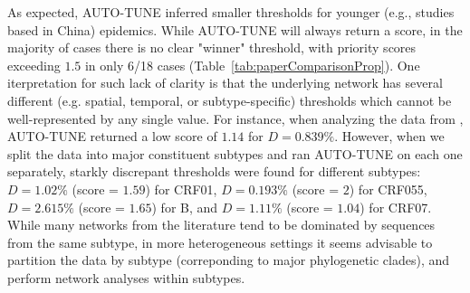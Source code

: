 \documentclass[utf8]{FrontiersinHarvard} %
\begin{document}
As expected, AUTO-TUNE inferred smaller thresholds for younger (e.g., studies
based in China) epidemics. While AUTO-TUNE will always return a score, in the
majority of cases there is no clear "winner" threshold, with priority scores
exceeding $1.5$ in only 6/18 cases (Table~\ref{tab:paperComparisonProp}). One
iterpretation for such lack of clarity is that the underlying network has
several different (e.g. spatial, temporal, or subtype-specific) thresholds
which cannot be well-represented by any single value.  For instance, when
analyzing the data from \citet{Yan:2021aa}, AUTO-TUNE returned a low score of
$1.14$ for $D=0.839\%$. However, when we split the  data into major constituent
subtypes and ran AUTO-TUNE on each one separately, starkly discrepant
thresholds were found for different subtypes: $D=1.02\%$ (score = $1.59$) for
CRF01,   $D=0.193\%$ (score = $2$) for CRF055,  $D=2.615\%$ (score = $1.65$)
for B,  and $D=1.11\%$ (score = $1.04$) for CRF07. While many networks from the
literature tend to be dominated by sequences from the same subtype, in more
heterogeneous settings it seems advisable to partition the data by subtype
(correponding to major phylogenetic clades), and perform network analyses
within subtypes. 
\end{document}
